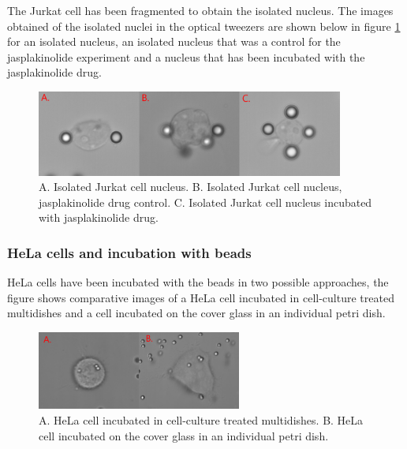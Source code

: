 \documentclass[12pt, a4paper]{article} %
\begin{document}
The Jurkat cell has been fragmented to obtain the isolated nucleus. The images obtained of the isolated nuclei in the optical tweezers are shown below in figure \ref{fig:jurkat_cells} for an isolated nucleus, an isolated nucleus that was a control for the jasplakinolide experiment and a nucleus that has been incubated with the jasplakinolide drug.

\setlength{\parskip}{4mm}

\begin{figure}[htbp]
	\centering
	\includegraphics[width=0.9\textwidth]{figures/jurkat_cell_shape.png}
	\caption{A. Isolated Jurkat cell nucleus. B. Isolated Jurkat cell nucleus, jasplakinolide drug control. C. Isolated Jurkat cell nucleus incubated with jasplakinolide drug.}
	\label{fig:jurkat_cells}
\end{figure}

\setlength{\parskip}{0mm}

\subsubsection{HeLa cells and incubation with beads}

HeLa cells have been incubated with the beads in two possible approaches, the figure shows comparative images of a HeLa cell incubated in cell-culture treated multidishes and a cell incubated on the cover glass in an individual petri dish.

\setlength{\parskip}{4mm}

\begin{figure}[htbp]
	\centering
	\includegraphics[width=0.60\textwidth]{figures/hela_cell_shape.png}
	\caption{A. HeLa cell incubated in cell-culture treated multidishes. B. HeLa cell incubated on the cover glass in an individual petri dish.}
	\label{fig:hela_cell_shape} 
\end{figure}
\end{document}
